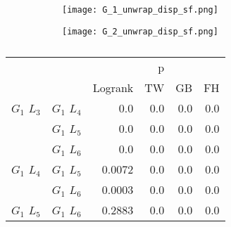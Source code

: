       \begin{figure}
        \centering
        
        \begin{subfigure}[b]{0.45\textwidth}
          \texttt{[image: G\_1\_unwrap\_disp\_sf.png]}
          \caption{}
          \label{fig:sf_g1_branch_disp}
        \end{subfigure}
        \hfill
        \begin{subfigure}[b]{0.45\textwidth}
          \texttt{[image: G\_2\_unwrap\_disp\_sf.png]}
          \caption{}
          \label{fig:sf_g2_branch_disp}
        \end{subfigure}

        \caption{}
        \label{fig:sf_branch_disp}

      \end{figure}




      \begin{table}
        \centering
        \begin{tabular}{llrrrr}
          \toprule
                       &             &         &  p &    &     \\
          \cmidrule{3-6}
                       &             & Logrank & TW & GB & FH  \\
          \midrule
          $G_1$ $L_3$  & $G_1$ $L_4$  &  0.0 &  0.0 &  0.0 &  0.0     \\
                       & $G_1$ $L_5$  & 0.0 & 0.0 & 0.0 & 0.0    \\
                       & $G_1$ $L_6$  & 0.0 & 0.0 & 0.0 & 0.0      \\
          $G_1$ $L_4$  & $G_1$ $L_5$  & 0.0072 & 0.0 & 0.0 & 0.0      \\
                       & $G_1$ $L_6$  & 0.0003 & 0.0 & 0.0 & 0.0       \\
          $G_1$ $L_5$   & $G_1$ $L_6$ & 0.2883 &  0.0 & 0.0 & 0.0      \\
          \bottomrule
        \end{tabular}
        \label{tab:g1_ingroup_tests_disp}
        \caption{}
      \end{table}


